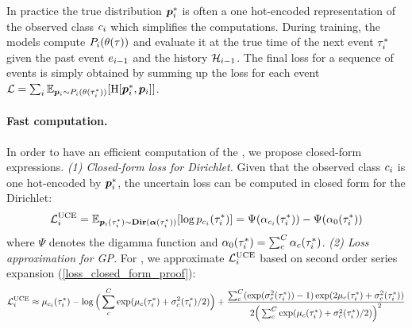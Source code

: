 In practice the true distribution $\bm{p}_{i}^*$ is often a one hot-encoded representation of the observed class $c_{i}$ which simplifies the computations. During training, the models compute $P_{i}(\theta(\tau))$ and evaluate it at the true time of the next event $\tau_{i}^*$ given the past event $e_{i-1}$ and the history $\mathcal{H}_{i-1}$. The final loss for a sequence of events is simply obtained by summing up the loss for each event
$\mathcal{L}=\sum_i \operatorname{\mathbb{E}}_{\bm{p}_{i} \sim P_{i}(\theta(\tau_{i}^*))}[\operatorname{H}[\bm{p}_{i}^*, \bm{p}_{i}]]$.

\paragraph{Fast computation.}  In order to have an efficient computation of the \UncertaintyLoss, we propose closed-form expressions.
\textit{(1) Closed-form loss for Dirichlet.} Given that the observed class $c_i$ is one hot-encoded by $\bm{p}_i^*$, the uncertain loss can be computed in closed form for the Dirichlet:
\begin{equation} \label{eq:dir_loss}
\mathcal{L}_i^{\text{UCE}} = \operatorname{\mathbb{E}}_{\bm{p}_i(\tau_i^*) \sim \textbf{Dir}(\bm{\alpha}(\tau_i^*))}[\log p_{c_i}(\tau_i^*)] = \Psi(\alpha_{c_i}(\tau_i^*)) - \Psi(\alpha_0(\tau_i^*))
\end{equation}
where $\Psi$ denotes the digamma function and $\alpha_0(\tau_i^*) = \sum_c^C \alpha_c(\tau_i^*)$.
\textit{(2) Loss approximation for GP.} For \GPModel, we approximate $ \mathcal{L}_i^{\text{UCE}}$ based on second order series expansion (\cref{loss_closed_form_proof}):
\small
\begin{equation} \label{eq:gp_loss}
    \mathcal{L}_i^{\text{UCE}}
    \approx \mu_{c_i}(\tau_i^*) - \log \Big( \sum_c^C \exp(\mu_c(\tau_i^*) + \sigma_c^2(\tau_i^*) / 2) \Big) +
        \frac{\sum_c^C (\exp(\sigma_c^2(\tau_i^*)) - 1) \exp(2 \mu_c(\tau_i^*) + \sigma_c^2(\tau_i^*))}
        {2 \Big( \sum_c^C \exp(\mu_c(\tau_i^*) + \sigma_c^2(\tau_i^*) / 2) \Big)^2}
\end{equation}
\normalsize


